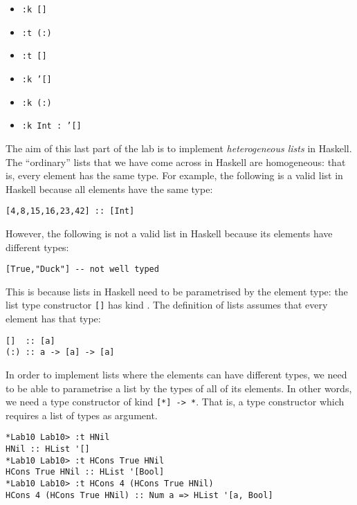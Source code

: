 \taskLine

\begin{itemize}
	\item \texttt{\small :k []}
	\item \texttt{\small :t (:)}
	\item \texttt{\small :t []}
	\item \texttt{\small :k '[]}
	\item \texttt{\small :k (:)}
	\item \texttt{\small :k Int :~'[]}
\end{itemize}

\taskLine 

The aim of this last part of the lab is to implement \emph{heterogeneous lists} in Haskell. The ``ordinary'' lists that we have come across in Haskell are homogeneous: that is, every element has the same type. For example, the following is a valid list in Haskell because all elements have the same type:
\begin{verbatim}
[4,8,15,16,23,42] :: [Int]
\end{verbatim}  
However, the following is not a valid list in Haskell because its elements have different types:
\begin{verbatim}
[True,"Duck"] -- not well typed
\end{verbatim} 
This is because lists in Haskell need to be parametrised by the element type: the list type constructor \texttt{\small []} has kind \haskellIn{* -> *}. The definition of lists assumes that every element has that type:
\begin{verbatim}
[]  :: [a]
(:) :: a -> [a] -> [a]
\end{verbatim} 
In order to implement lists where the elements can have different types, we need to be able to parametrise a list by the types of all of its elements. In other words, we need a type constructor of kind \texttt{\small [*] -> *}. That is, a type constructor which requires a list of types as argument.

\begin{verbatim}
*Lab10 Lab10> :t HNil
HNil :: HList '[]
*Lab10 Lab10> :t HCons True HNil
HCons True HNil :: HList '[Bool]
*Lab10 Lab10> :t HCons 4 (HCons True HNil)
HCons 4 (HCons True HNil) :: Num a => HList '[a, Bool]
\end{verbatim}

